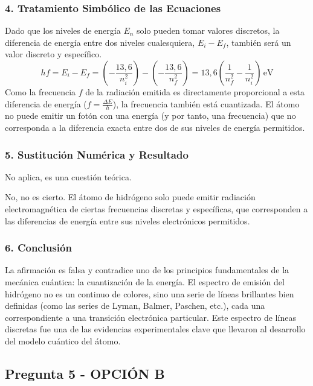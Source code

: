 \subsubsection*{4. Tratamiento Simbólico de las Ecuaciones}
Dado que los niveles de energía $E_n$ solo pueden tomar valores discretos, la diferencia de energía entre dos niveles cualesquiera, $E_i - E_f$, también será un valor discreto y específico.
$$hf = E_i - E_f = \left(-\frac{13,6}{n_i^2}\right) - \left(-\frac{13,6}{n_f^2}\right) = 13,6 \left(\frac{1}{n_f^2} - \frac{1}{n_i^2}\right) \, \text{eV}$$
Como la frecuencia $f$ de la radiación emitida es directamente proporcional a esta diferencia de energía ($f = \frac{\Delta E}{h}$), la frecuencia también está cuantizada. El átomo no puede emitir un fotón con una energía (y por tanto, una frecuencia) que no corresponda a la diferencia exacta entre dos de sus niveles de energía permitidos.

\subsubsection*{5. Sustitución Numérica y Resultado}
No aplica, es una cuestión teórica.
\begin{cajaresultado}
No, no es cierto. El átomo de hidrógeno solo puede emitir radiación electromagnética de ciertas frecuencias discretas y específicas, que corresponden a las diferencias de energía entre sus niveles electrónicos permitidos.
\end{cajaresultado}

\subsubsection*{6. Conclusión}
\begin{cajaconclusion}
La afirmación es falsa y contradice uno de los principios fundamentales de la mecánica cuántica: la cuantización de la energía. El espectro de emisión del hidrógeno no es un continuo de colores, sino una serie de líneas brillantes bien definidas (como las series de Lyman, Balmer, Paschen, etc.), cada una correspondiente a una transición electrónica particular. Este espectro de líneas discretas fue una de las evidencias experimentales clave que llevaron al desarrollo del modelo cuántico del átomo.
\end{cajaconclusion}

\newpage

\subsection{Pregunta 5 - OPCIÓN B}
\label{subsec:5B_2002_sep_ext}

